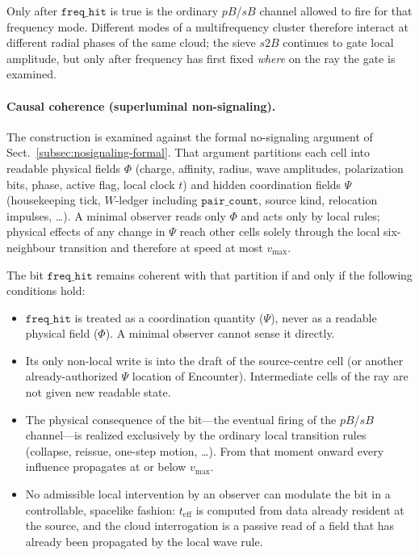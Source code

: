 \documentclass{ijuc}
\begin{document}
Only after $\texttt{freq\_hit}$ is true is the ordinary $pB$/$sB$ channel allowed to fire for that frequency mode. Different modes of a multifrequency cluster therefore interact at different radial phases of the same cloud; the sieve $s2B$ continues to gate local amplitude, but only after frequency has first fixed \emph{where} on the ray the gate is examined.

\paragraph{Causal coherence (superluminal non-signaling).}
The construction is examined against the formal no-signaling argument of Sect.~\ref{subsec:nosignaling-formal}. That argument partitions each cell into readable physical fields $\Phi$ (charge, affinity, radius, wave amplitudes, polarization bits, phase, active flag, local clock $t$) and hidden coordination fields $\Psi$ (housekeeping tick, $W$-ledger including $\texttt{pair\_count}$, source kind, relocation impulses, \ldots). A minimal observer reads only $\Phi$ and acts only by local rules; physical effects of any change in $\Psi$ reach other cells solely through the local six-neighbour transition and therefore at speed at most $v_{\max}$.

The bit $\texttt{freq\_hit}$ remains coherent with that partition if and only if the following conditions hold:

\begin{itemize}
\item $\texttt{freq\_hit}$ is treated as a coordination quantity ($\Psi$), never as a readable physical field ($\Phi$). A minimal observer cannot sense it directly.
\item Its only non-local write is into the draft of the source-centre cell (or another already-authorized $\Psi$ location of Encounter). Intermediate cells of the ray are not given new readable state.
\item The physical consequence of the bit---the eventual firing of the $pB$/$sB$ channel---is realized exclusively by the ordinary local transition rules (collapse, reissue, one-step motion, \ldots). From that moment onward every influence propagates at or below $v_{\max}$.
\item No admissible local intervention by an observer can modulate the bit in a controllable, spacelike fashion: $t_{\mathrm{eff}}$ is computed from data already resident at the source, and the cloud interrogation is a passive read of a field that has already been propagated by the local wave rule.
\end{itemize}
\end{document}
